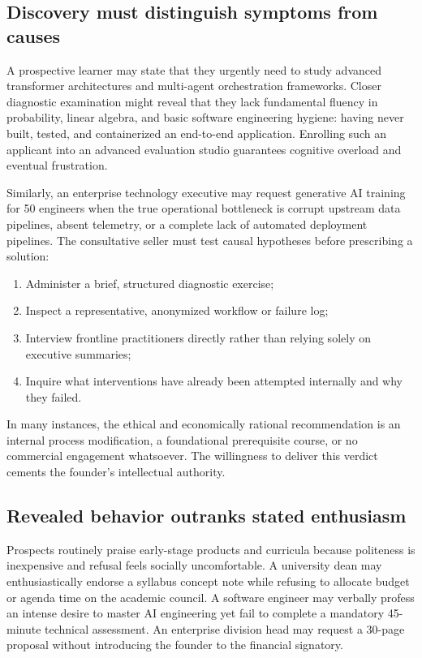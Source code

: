 \subsection{Discovery must distinguish symptoms from causes}

A prospective learner may state that they urgently need to study advanced transformer architectures and multi-agent orchestration frameworks. Closer diagnostic examination might reveal that they lack fundamental fluency in probability, linear algebra, and basic software engineering hygiene: having never built, tested, and containerized an end-to-end application. Enrolling such an applicant into an advanced evaluation studio guarantees cognitive overload and eventual frustration.

Similarly, an enterprise technology executive may request generative AI training for 50 engineers when the true operational bottleneck is corrupt upstream data pipelines, absent telemetry, or a complete lack of automated deployment pipelines. The consultative seller must test causal hypotheses before prescribing a solution:
\begin{enumerate}
\item Administer a brief, structured diagnostic exercise;
\item Inspect a representative, anonymized workflow or failure log;
\item Interview frontline practitioners directly rather than relying solely on executive summaries;
\item Inquire what interventions have already been attempted internally and why they failed.
\end{enumerate}
In many instances, the ethical and economically rational recommendation is an internal process modification, a foundational prerequisite course, or no commercial engagement whatsoever. The willingness to deliver this verdict cements the founder's intellectual authority.

\subsection{Revealed behavior outranks stated enthusiasm}

Prospects routinely praise early-stage products and curricula because politeness is inexpensive and refusal feels socially uncomfortable. A university dean may enthusiastically endorse a syllabus concept note while refusing to allocate budget or agenda time on the academic council. A software engineer may verbally profess an intense desire to master AI engineering yet fail to complete a mandatory 45-minute technical assessment. An enterprise division head may request a 30-page proposal without introducing the founder to the financial signatory.

